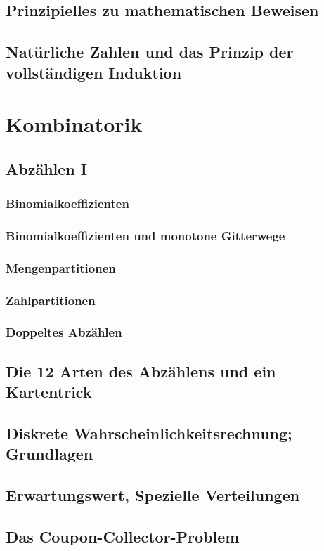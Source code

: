 \subsection{Prinzipielles zu mathematischen Beweisen}
\subsection{Natürliche Zahlen und das Prinzip der vollständigen Induktion}
%
%
%
\section{Kombinatorik}

\subsection{Abzählen I}
\subsubsection{Binomialkoeffizienten}
\subsubsection{Binomialkoeffizienten und monotone Gitterwege}
\subsubsection{Mengenpartitionen}
\subsubsection{Zahlpartitionen}
\subsubsection{Doppeltes Abzählen}
\subsection{Die 12 Arten des Abzählens und ein Kartentrick}
\subsection{Diskrete Wahrscheinlichkeitsrechnung; Grundlagen}
\subsection{Erwartungswert, Spezielle Verteilungen}
\subsection{Das Coupon-Collector-Problem}
